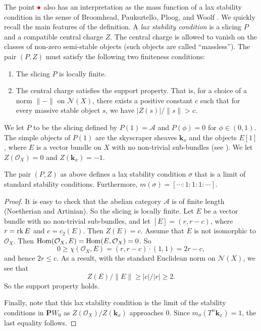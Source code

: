 \documentclass{amsart}
\begin{document}
The point \(\textcolor{red}{\bullet}\) also has an interpretation as the mass function of a lax stability condition in the sense of Broomhead, Pauksztello, Ploog, and Woolf \cite{bro.pau.plo.ea:22}.
We quickly recall the main features of the definition.
A \emph{lax stability condition} is a slicing \(P\) and a compatible central charge \(Z\).
The central charge is allowed to vanish on the classes of non-zero semi-stable objects (such objects are called ``massless'').
The pair \((P,Z)\) must satisfy the following two finiteness conditions:
\begin{enumerate}
\item The slicing \(P\) is locally finite.
\item The central charge satisfies the support property.
  That is, for a choice of a norm \(\|-\|\) on \(\mathcal{N}(X)\), there exists a positive constant \(c\) such that for every massive stable object \(s\), we have \(|Z(s)|/\|s\| > c\).
\end{enumerate}
We let \(P\) to be the slicing defined by \(P(1) = \mathcal{A}\) and \(P(\phi) = 0\) for \(\phi \in (0,1)\).
The simple objects of \(P(1)\) are the skyscraper sheaves \(\mathbf{k}_x\) and the objects \(E[1]\), where \(E\) is a vector bundle on \(X\) with no non-trivial sub-bundles (see \cite[Remark~4.3 (iii)]{huy.mac.ste:08}).
We let \(Z(\mathcal{O}_X) = 0\) and \(Z(\mathbf{k}_x) = -1\).
\begin{proposition}\label{prop:red}
  The pair \((P,Z)\) as above defines a lax stability condition \(\sigma\) that is a limit of standard stability conditions.
  Furthermore, \(m(\sigma) = [\cdots : 1 : 1: 1 : \cdots]\).
\end{proposition}
\begin{proof}
  It is easy to check that the abelian category \(\mathcal{A}\) is of finite length (Noetherian and Artinian).
  So the slicing is locally finite.
  Let \(E\) be a vector bundle with no non-trivial sub-bundles, and let \([E] = (r,r-c)\), where \(r = \operatorname{rk} E\) and \(c = c_2(E)\).
  Then \(Z(E) = c\).
  Assume that \(E\) is not isomorphic to \(\mathcal{O}_X\).
  Then \(\operatorname{Hom}(\mathcal{O}_X, E) = \operatorname{Hom}(E, \mathcal{O}_X) = 0\).
  So \[0 \geq \chi(\mathcal{O}_X, E) = (r,r-c) \cdot (1,1) =  2r-c,\]
  and hence \(2r \leq c\).
  As a result, with the standard Euclidean norm on \(\mathcal{N}(X)\), we see that \[Z(E)/\|E\| \geq |c|/|r| \geq 2.\]
  So the support property holds.

  Finally, note that this lax stability condition is the limit of the stability conditions in \(\mathbf{P}W_0\) as \(Z(\mathcal{O}_{X})/Z(\mathbf{k}_x)\) approaches \(0\).
  Since \(m_{\sigma}(T^n \mathbf{k}_x) = 1\), the last equality follows.
\end{proof}
\end{document}
